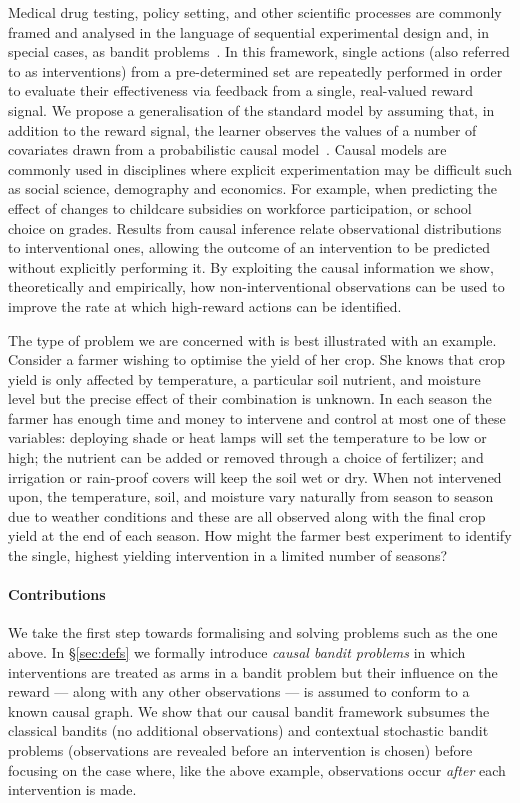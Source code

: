 Medical drug testing, policy setting, and other scientific processes are commonly framed and analysed in the language of sequential experimental design and, in special cases, as bandit problems~\citep{Robbins1952,Chernoff1959}. 
In this framework, single actions (also referred to as interventions) from a pre-determined set are repeatedly performed in 
order to evaluate their effectiveness via feedback from a single, real-valued reward signal.
We propose a generalisation of the standard model by assuming that, in addition to the reward signal, the learner observes the values of a number of covariates 
drawn from a probabilistic causal model~\citep{Pearl2000}.
Causal models are commonly used in disciplines where explicit experimentation may be difficult such as social science, demography and economics.
For example, when predicting the effect of changes to childcare subsidies on workforce participation, or school choice on grades. 
Results from causal inference relate observational distributions to interventional ones, allowing the outcome of an intervention to be predicted without
explicitly performing it.
By exploiting the causal information we show, theoretically and empirically, how non-interventional observations can be used to improve the rate at 
which high-reward actions can be identified.

The type of problem we are concerned with is best illustrated with an example. 
Consider a farmer wishing to optimise the yield of her crop. 
She knows that crop yield is only affected by temperature, a particular soil nutrient, and moisture level but the precise effect of their combination is unknown.
In each season the farmer has enough time and money to intervene and control at most one of these variables:
deploying shade or heat lamps will set the temperature to be low or high; the nutrient can be added or removed through a choice of fertilizer; and irrigation or rain-proof covers will keep the soil wet or dry.
When not intervened upon, the temperature, soil, and moisture vary naturally from season to season due to weather conditions and these are all observed along with the final crop yield at the end of each season.
How might the farmer best experiment to identify the single, highest yielding intervention in a limited number of seasons?
\paragraph{Contributions} We take the first step towards formalising and solving problems such as the one above. 
In \S\ref{sec:defs} we formally introduce \emph{causal bandit problems} in which interventions are treated as arms in a bandit problem but their influence on the reward --- along with any other observations --- is assumed to conform to a known causal graph. 
We show that our causal bandit framework subsumes the classical bandits (no additional observations) and contextual stochastic bandit problems (observations are revealed before an intervention is chosen) before focusing on the case where, like the above example, observations occur \emph{after} each intervention is made.

